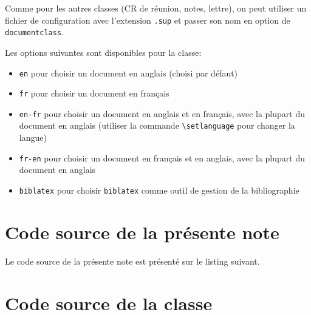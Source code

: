 \documentclass[fr]{supaero-note-cf}
\begin{document}
Comme pour les autres classes (CR de réunion, notes, lettre), on
peut utiliser un fichier de configuration avec l'extension
\texttt{.sup} et passer son nom en option de \texttt{documentclass}.

Les options suivantes sont disponibles pour la classe:
\begin{itemize}
\item \verb!en! pour choisir un document en anglais (choisi par
  défaut)
\item \verb!fr! pour choisir un document en français
\item \verb!en-fr! pour choisir un document en anglais et en
  français, avec la plupart du document en anglais (utiliser la
  commande \verb!\setlanguage! pour changer la langue)
\item \verb!fr-en! pour choisir un document en français et en
  anglais, avec la plupart du document en anglais
\item \verb!biblatex! pour choisir \verb!biblatex! comme outil de
  gestion de la bibliographie
\end{itemize}

\section{Code source de la présente note}
\label{sec:code-source}

Le code source de la présente note est présenté sur le listing
suivant.



\section{Code source de la classe}
\label{sec:code-source-supaero-note(cf)}


\end{document}
